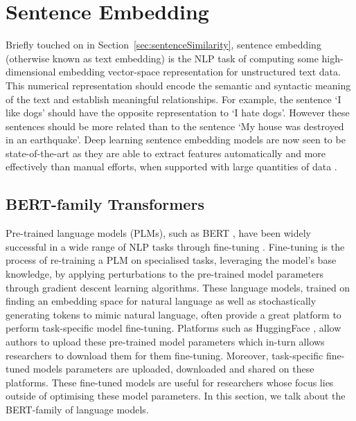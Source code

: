 \documentclass[10pt,oneside]{report}
\begin{document}

\section{Sentence Embedding}\label{sec:sentenceEmbedding}
Briefly touched on in Section~\ref{sec:sentenceSimilarity}, sentence embedding (otherwise known as text embedding) is the NLP task of computing some high-dimensional embedding vector-space representation for unstructured text data. This numerical representation should encode the semantic and syntactic meaning of the text and establish meaningful relationships. For example, the sentence `I like dogs' should have the opposite representation to  `I hate dogs'.  However these sentences should be more related than to the sentence `My house was destroyed in an earthquake'. Deep learning sentence embedding models are now seen to be state-of-the-art as they are able to extract features automatically and more effectively than manual efforts, when supported with large quantities of data \cite{liang2017text}.

\subsection{BERT-family Transformers}\label{sec:BERT}
Pre-trained language models (PLMs), such as BERT \cite{devlin2019bert}, have been widely successful in a wide range of NLP tasks through fine-tuning \cite{edunov2019pre, min2023recent}. Fine-tuning is the process of re-training a PLM on specialised tasks, leveraging the model's base knowledge, by applying perturbations to the pre-trained model parameters through gradient descent learning algorithms. These language models, trained on finding an embedding space for natural language as well as stochastically generating tokens to mimic natural language, often provide a great platform to perform task-specific model fine-tuning. 
Platforms such as HuggingFace \cite{wolf2019huggingface}, allow authors to upload these pre-trained model parameters which in-turn allows researchers to download them for them fine-tuning. Moreover, task-specific fine-tuned models parameters are uploaded, downloaded and shared on these platforms. These fine-tuned models are useful for researchers whose focus lies outside of optimising these model parameters.
In this section, we talk about the BERT-family of language models.
\end{document}
